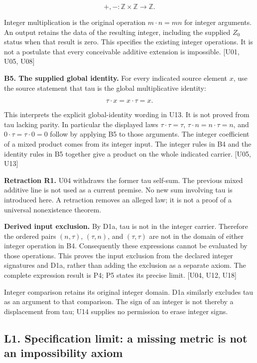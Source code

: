 \[
+, -:\mathbb Z\times\mathbb Z\longrightarrow\mathbb Z.
\]

Integer multiplication is the original operation \(m\cdot n=mn\) for
integer arguments. An output retains the data of the resulting integer,
including the supplied \(Z_0\) status when that result is zero. This
specifies the existing integer operations. It is not a postulate that
every conceivable additive extension is impossible. {[}U01, U05, U08{]}

\textbf{B5. The supplied global identity.} For every indicated source
element \(x\), use the source statement that tau is the global
multiplicative identity:

\[
\tau\cdot x=x\cdot\tau=x.
\]

This interprets the explicit global-identity wording in U13. It is not
proved from tau lacking parity. In particular the displayed laws
\(\tau\cdot\tau=\tau\), \(\tau\cdot n=n\cdot\tau=n\), and
\(0\cdot\tau=\tau\cdot0=0\) follow by applying B5 to those arguments.
The integer coefficient of a mixed product comes from its integer input.
The integer rules in B4 and the identity rules in B5 together give a
product on the whole indicated carrier. {[}U05, U13{]}

\textbf{Retraction R1.} U04 withdraws the former tau self-sum. The
previous mixed additive line is not used as a current premise. No new
sum involving tau is introduced here. A retraction removes an alleged
law; it is not a proof of a universal nonexistence theorem.

\textbf{Derived input exclusion.} By D1a, tau is not in the integer
carrier. Therefore the ordered pairs \((n,\tau)\), \((\tau,n)\), and
\((\tau,\tau)\) are not in the domain of either integer operation in B4.
Consequently these expressions cannot be evaluated by those operations.
This proves the input exclusion from the declared integer signatures and
D1a, rather than adding the exclusion as a separate axiom. The complete
expression result is P4; P5 states its precise limit. {[}U04, U12,
U18{]}

Integer comparison retains its original integer domain. D1a similarly
excludes tau as an argument to that comparison. The sign of an integer
is not thereby a displacement from tau; U14 supplies no permission to
erase integer signs.

\subsection{L1. Specification limit: a missing metric is not an
impossibility
axiom}\label{uad-l1.-specification-limit-a-missing-metric-is-not-an-impossibility-axiom}

